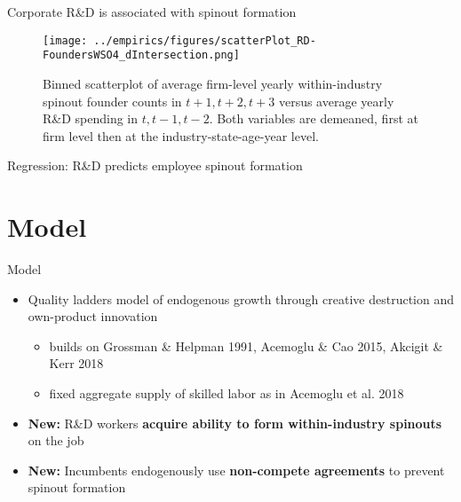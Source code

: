 \documentclass[english,usenames,dvipsnames]{beamer}
\begin{document}
\begin{frame}{Corporate R\&D is associated with spinout formation}
	\begin{figure}[!htb]
		\centering
		\texttt{[image: ../empirics/figures/scatterPlot\_RD-FoundersWSO4\_dIntersection.png]}
		\caption{\footnotesize Binned scatterplot of average firm-level yearly within-industry spinout founder counts in $t+1,t+2,t+3$ versus average yearly R\&D spending in $t,t-1,t-2$. Both variables are demeaned, first at firm level then at the industry-state-age-year level.}
	\end{figure}
\end{frame}

\begin{frame}{Regression: R\&D predicts employee spinout formation}
	\label{empirics:mainRegression}
	\begin{table}
		\scriptsize
		\centering
		
		\caption{\scriptsize The dependent variable is average yearly number of founders joining WSOs (4-digit NAICS) in years $t+1,t+2,t+3$. The independent variables are averages over $t,t-1,t-2$. Firm controls are employment, assets, intangible assets, investment, net income, sales, cumulative citation-weighted patents, and market value. The regression also includes firm, age, industry-year, and state-year fixed effects. Standard errors are multiway clustered at the industry and state levels.}
	\end{table}
	\hyperlink{empirics:ppmlRegressions}{}
\end{frame}


\section{Model}

\begin{frame}
	\tableofcontents[currentsection]
\end{frame}

\begin{frame}{Model}
	\begin{itemize}	
		\item Quality ladders model of endogenous growth through creative destruction and own-product innovation
		\begin{itemize}
			\item builds on Grossman \& Helpman 1991, Acemoglu \& Cao 2015, Akcigit \& Kerr 2018
			\item fixed aggregate supply of skilled labor as in Acemoglu et al. 2018
		\end{itemize}
		\medskip
		\item \alert{\textbf{New:}} R\&D workers \textbf{\alert{acquire ability to form within-industry spinouts}} on the job
		\medskip
		\item \alert{\textbf{New:}} Incumbents endogenously use \alert{\textbf{non-compete agreements}} to prevent spinout formation
	\end{itemize}
\end{frame}
\end{document}
